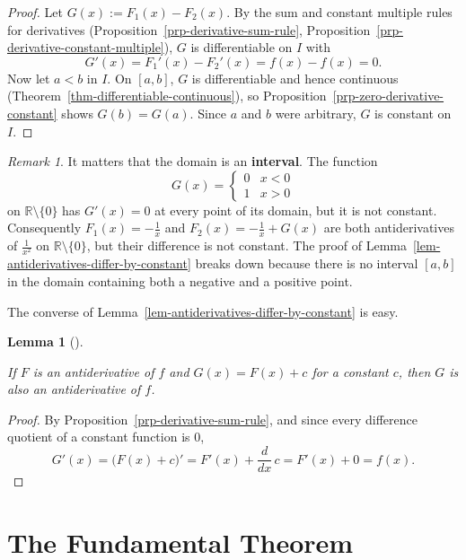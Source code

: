 \documentclass[
  letterpaper,
  DIV=11,
  numbers=noendperiod]{scrreprt}
\theoremstyle{plain}
\newtheorem{lemma}{Lemma}[chapter]
\theoremstyle{plain}
\theoremstyle{definition}
\theoremstyle{definition}
\theoremstyle{definition}
\theoremstyle{plain}
\theoremstyle{plain}
\theoremstyle{remark}
\newtheorem{refremark}{Remark}[chapter]
\begin{document}
\begin{proof}
Let \(G(x) := F_1(x) - F_2(x)\). By the sum and constant multiple rules
for derivatives (Proposition~\ref{prp-derivative-sum-rule},
Proposition~\ref{prp-derivative-constant-multiple}), \(G\) is
differentiable on \(I\) with \[
G'(x) = F_1'(x) - F_2'(x) = f(x) - f(x) = 0 .
\] Now let \(a<b\) in \(I\). On \([a,b]\), \(G\) is differentiable and
hence continuous (Theorem~\ref{thm-differentiable-continuous}), so
Proposition~\ref{prp-zero-derivative-constant} shows \(G(b)=G(a)\).
Since \(a\) and \(b\) were arbitrary, \(G\) is constant on \(I\).
\end{proof}

\begin{refremark}
It matters that the domain is an \textbf{interval}. The function \[
G(x) = \begin{cases} 0 & x<0 \\ 1 & x>0 \end{cases}
\] on \(\mathbb{R}\setminus\{0\}\) has \(G'(x)=0\) at every point of its
domain, but it is not constant. Consequently \(F_1(x)=-\frac1x\) and
\(F_2(x)=-\frac1x+G(x)\) are both antiderivatives of \(\frac1{x^2}\) on
\(\mathbb{R}\setminus\{0\}\), but their difference is not constant. The
proof of Lemma~\ref{lem-antiderivatives-differ-by-constant} breaks down
because there is no interval \([a,b]\) in the domain containing both a
negative and a positive point.

\label{rem-interval-needed}

\end{refremark}

The converse of Lemma~\ref{lem-antiderivatives-differ-by-constant} is
easy.

\begin{lemma}[]\protect\hypertarget{lem-antiderivative-plus-constant}{}\label{lem-antiderivative-plus-constant}

\hfill\break
If \(F\) is an antiderivative of \(f\) and \(G(x) = F(x)+c\) for a
constant \(c\), then \(G\) is also an antiderivative of \(f\).

\end{lemma}

\begin{proof}
By Proposition~\ref{prp-derivative-sum-rule}, and since every difference
quotient of a constant function is \(0\), \[
G'(x) = \big(F(x)+c\big)' = F'(x) + \frac{d}{dx}\,c = F'(x) + 0 = f(x).
\]
\end{proof}

\section{The Fundamental Theorem}\label{the-fundamental-theorem-1}
\end{document}
